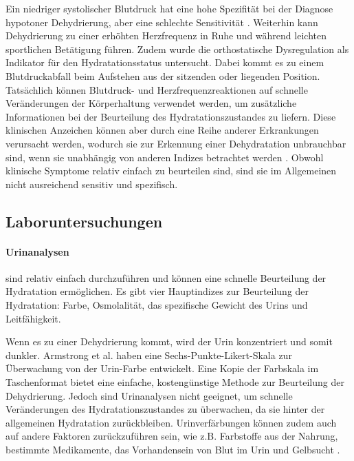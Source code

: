 \documentclass[10pt,a4paper,headinclude,twoside, plainheadsepline, open=right, numbers=noenddot, twocolumn]{article}
\begin{document}
Ein niedriger systolischer Blutdruck hat eine hohe Spezifität bei der Diagnose hypotoner Dehydrierung, aber eine schlechte Sensitivität \cite{fortes2015elderly}.
Weiterhin kann Dehydrierung zu einer erhöhten Herzfrequenz in Ruhe und während leichten sportlichen Betätigung führen.
Zudem wurde die orthostatische Dysregulation als Indikator für den Hydratationsstatus untersucht. 
Dabei kommt es zu einem Blutdruckabfall beim Aufstehen aus der sitzenden oder liegenden Position.
Tatsächlich können Blutdruck- und Herzfrequenzreaktionen auf schnelle Veränderungen der Körperhaltung verwendet werden, um zusätzliche Informationen bei der Beurteilung des Hydratationszustandes zu liefern.
Diese klinischen Anzeichen können aber durch eine Reihe anderer Erkrankungen verursacht werden, wodurch sie zur Erkennung einer Dehydratation unbrauchbar sind, wenn sie unabhängig von anderen Indizes betrachtet werden
\cite{garret2018engineering}
\cite{kavouras2002assessing}
\cite{davis1997effect}.
Obwohl klinische Symptome relativ einfach zu beurteilen sind, sind sie im Allgemeinen nicht ausreichend sensitiv und spezifisch.

\subsection{Laboruntersuchungen}
\label{laboruntersuchungen}

\paragraph{Urinanalysen} sind relativ einfach durchzuführen und können eine schnelle Beurteilung der Hydratation ermöglichen.
Es gibt vier Hauptindizes zur Beurteilung der Hydratation: Farbe, Osmolalität, das spezifische Gewicht des Urins und Leitfähigkeit.

Wenn es zu einer Dehydrierung kommt, wird der Urin konzentriert und somit dunkler.
Armstrong et al.\cite{armstrong1994urinary} haben eine Sechs-Punkte-Likert-Skala zur Überwachung von der Urin-Farbe entwickelt.
Eine Kopie der Farbskala im Taschenformat bietet eine einfache, kostengünstige Methode zur Beurteilung der Dehydrierung.
Jedoch sind Urinanalysen nicht geeignet, um schnelle Veränderungen des Hydratationszustandes zu überwachen, da sie hinter der allgemeinen Hydratation zurückbleiben.
Urinverfärbungen können zudem auch auf andere Faktoren zurückzuführen sein, wie z.B. Farbstoffe aus der Nahrung, bestimmte Medikamente, das Vorhandensein von Blut im Urin und Gelbsucht \cite{garret2018engineering}.
\end{document}
